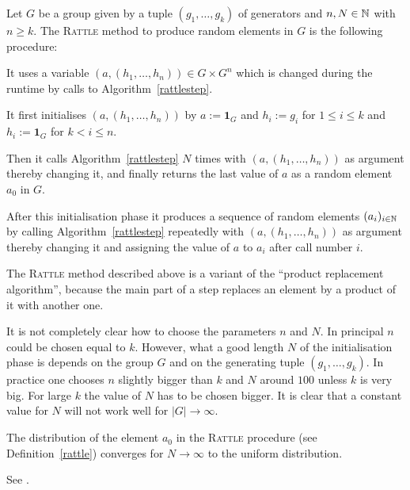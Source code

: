 \begin{Def}
    \label{rattle}
%
Let $G$ be a group given by a tuple $(g_1, \ldots, g_k)$ of generators
and $n, N \in \mathbb{N}$ with $n \ge k$. The \textsc{Rattle} method to
produce random elements in $G$ is the following procedure:

It uses a variable $(a,(h_1,\ldots,h_n)) \in G \times G^n$
which is changed during the runtime by calls to
Algorithm~\ref{rattlestep}.

It first initialises $(a,(h_1,\ldots,h_n))$
by $a := \mathbf{1}_G$ and $h_i := g_i$ for $1 \le i \le k$ and $h_i
:= \mathbf{1}_G$ for $k < i \le n$.

Then it calls Algorithm~\ref{rattlestep} $N$
times with $(a,(h_1, \ldots, h_n))$ as argument
thereby changing it, and
finally returns the last value of $a$ as a random element $a_0$ in $G$.

After this initialisation phase it produces a sequence of random
elements $(a_i)_{i \in \mathbb{N}}$ by calling 
Algorithm~\ref{rattlestep} repeatedly with 
$(a,(h_1, \ldots, h_n))$ as argument thereby changing it and
assigning the value of $a$ to $a_i$ after call number $i$.
\end{Def}

\begin{Rem}
%
The \textsc{Rattle} method described above is a variant of the
``product replacement algorithm'', because the main part of a step replaces 
an element by a product of it with another one.
\end{Rem}

\begin{Rem}
%
It is not completely clear how to choose the parameters $n$ and $N$. In
principal $n$ could be chosen equal to $k$. However, what a good length
$N$ of the initialisation phase is depends on the group $G$ and
on the generating tuple $(g_1, \ldots, g_k)$. In practice one chooses $n$
slightly bigger than $k$ and $N$ around $100$ unless $k$ is very big.
For large $k$ the value of $N$ has to be chosen bigger. It is clear
that a constant value for $N$ will not work well for $|G| \to \infty$.
\end{Rem}

\begin{Prop}
    \label{proprattle}
%
    The distribution of the element $a_0$ in the \textsc{Rattle} procedure (see
    Definition~\ref{rattle}) converges for $N \to \infty$ to the
    uniform distribution.
\end{Prop}
\proofbeg
See \cite[Section~4]{LGMurray}.
\proofend

